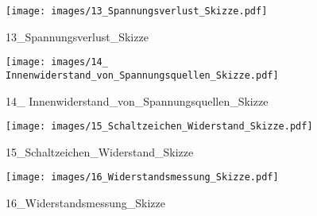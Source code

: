 %
%
\begin{figure}[!hb]%
    \centering
  \texttt{[image: images/13\_Spannungsverlust\_Skizze.pdf]}%
  \caption{13_Spannungsverlust_Skizze}%
\end{figure}

%
%
\begin{figure}[!hb]%
    \centering
  \texttt{[image: images/14\_ Innenwiderstand\_von\_Spannungsquellen\_Skizze.pdf]}%
  \caption{14_ Innenwiderstand_von_Spannungsquellen_Skizze}%
\end{figure}

%
%
\begin{figure}[!hb]%
    \centering
  \texttt{[image: images/15\_Schaltzeichen\_Widerstand\_Skizze.pdf]}%
  \caption{15_Schaltzeichen_Widerstand_Skizze}%
\end{figure}

%
%
\begin{figure}[!hb]%
    \centering
  \texttt{[image: images/16\_Widerstandsmessung\_Skizze.pdf]}%
  \caption{16_Widerstandsmessung_Skizze}%
\end{figure}

